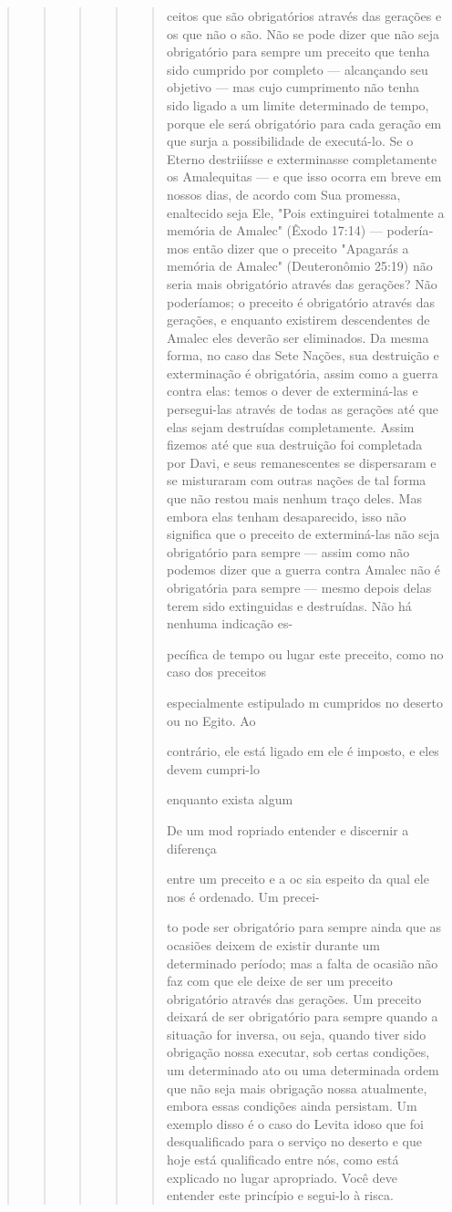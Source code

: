 \begin{quote}
\begin{quote}
\begin{quote}
\begin{quote}
\begin{quote}ceitos que são obrigatórios através das gerações e os que não o são. Não
se po­de dizer que não seja obrigatório para sempre um preceito que
tenha sido cum­prido por completo --- alcançando seu objetivo --- mas
cujo cumprimento não tenha sido ligado a um limite determinado de tempo,
porque ele será obrigató­rio para cada geração em que surja a
possibilidade de executá-lo. Se o Eterno destriiísse e exterminasse
completamente os Amalequitas --- e que isso ocorra em breve em nossos
dias, de acordo com Sua promessa, enaltecido seja Ele, "Pois extinguirei
totalmente a memória de Amalec" (Êxodo 17:14) --- podería­mos então
dizer que o preceito "Apagarás a memória de Amalec" (Deuteronô­mio
25:19) não seria mais obrigatório através das gerações? Não poderíamos;
o preceito é obrigatório através das gerações, e enquanto existirem
descenden­tes de Amalec eles deverão ser eliminados. Da mesma forma, no
caso das Sete Nações, sua destruição e exterminação é obrigatória, assim
como a guerra con­tra elas: temos o dever de exterminá-las e
persegui-las através de todas as gera­ções até que elas sejam destruídas
completamente. Assim fizemos até que sua destruição foi completada por
Davi, e seus remanescentes se dispersaram e se misturaram com outras
nações de tal forma que não restou mais nenhum traço deles. Mas embora
elas tenham desaparecido, isso não significa que o preceito de
exterminá-las não seja obrigatório para sempre --- assim como não
podemos dizer que a guerra contra Amalec não é obrigatória para sempre
--- mesmo de­pois delas terem sido extinguidas e destruídas. Não há
nenhuma indicação es-

pecífica de tempo ou lugar este preceito, como no caso dos preceitos

especialmente estipulado m cumpridos no deserto ou no Egito. Ao

contrário, ele está ligado em ele é imposto, e eles devem cumpri-lo

enquanto exista algum

De um mod ropriado entender e discernir a diferença

entre um preceito e a oc sia espeito da qual ele nos é ordenado. Um
precei-

to pode ser obrigatório para sempre ainda que as ocasiões deixem de
existir durante um determinado período; mas a falta de ocasião não faz
com que ele deixe de ser um preceito obrigatório através das gerações.
Um preceito deixará de ser obrigatório para sempre quando a situação for
inversa, ou seja, quando tiver sido obrigação nossa executar, sob certas
condições, um determinado ato ou uma determinada ordem que não seja mais
obrigação nossa atualmente, em­bora essas condições ainda persistam. Um
exemplo disso é o caso do Levita idoso que foi desqualificado para o
serviço no deserto e que hoje está qualifica­do entre nós, como está
explicado no lugar apropriado. Você deve entender este princípio e
segui-lo à risca.


\end{quote}
\end{quote}
\end{quote}
\end{quote}
\end{quote}
